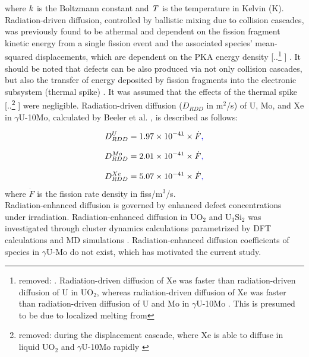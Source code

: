 \documentclass[preprint,12pt]{elsarticle}
\providecommand{\DIFadd}[1]{{\protect\color{blue} \sf #1}} %
\providecommand{\DIFdel}[1]{{\protect\color{red} [..\footnote{removed: #1} ]}} %
\providecommand{\DIFaddbegin}{} %
\providecommand{\DIFaddend}{} %
\providecommand{\DIFdelbegin}{} %
\providecommand{\DIFdelend}{} %
\newcommand{\DIFscaledelfig}{0.5}
\newlength{\DIFdelgraphicswidth} %
\newlength{\DIFdelgraphicsheight} %
\newcommand{\DIFaddincludegraphics}[2][]{{\color{blue}\fbox{\DIFOincludegraphics[#1]{#2}}}} %
\newcommand{\DIFdelincludegraphics}[2][]{%
\sbox{\DIFdelgraphicsbox}{\DIFOincludegraphics[#1]{#2}}%
\settoboxwidth{\DIFdelgraphicswidth}{\DIFdelgraphicsbox} %
\settoboxtotalheight{\DIFdelgraphicsheight}{\DIFdelgraphicsbox} %
\scalebox{\DIFscaledelfig}{%
\parbox[b]{\DIFdelgraphicswidth}{\usebox{\DIFdelgraphicsbox}\\[-\baselineskip] \rule{\DIFdelgraphicswidth}{0em}}\llap{\resizebox{\DIFdelgraphicswidth}{\DIFdelgraphicsheight}{%
\setlength{\unitlength}{\DIFdelgraphicswidth}%
\begin{picture}(1,1)%
\thicklines\linethickness{2pt} %
{\color[rgb]{1,0,0}\put(0,0){\framebox(1,1){}}}%
{\color[rgb]{1,0,0}\put(0,0){\line( 1,1){1}}}%
{\color[rgb]{1,0,0}\put(0,1){\line(1,-1){1}}}%
\end{picture}%
}\hspace*{3pt}}} %
} %
\DeclareRobustCommand{\DIFaddbegin}{\DIFOaddbegin \let\includegraphics\DIFaddincludegraphics} %
\DeclareRobustCommand{\DIFaddend}{\DIFOaddend \let\includegraphics\DIFOincludegraphics} %
\DeclareRobustCommand{\DIFdelbegin}{\DIFOdelbegin \let\includegraphics\DIFdelincludegraphics} %
\DeclareRobustCommand{\DIFdelend}{\DIFOaddend \let\includegraphics\DIFOincludegraphics} %
\begin{document}
\noindent where $\it{k}$ is the Boltzmann constant and $\it{T}$ is the temperature in Kelvin (K).\\
\indent Radiation-driven diffusion, controlled by ballistic mixing \DIFaddbegin \DIFadd{due to collision cascades}\DIFaddend , was previously found to be athermal and dependent on the fission fragment kinetic energy from a single fission event and the associated species' mean-squared displacements, which are dependent on the PKA energy density \DIFdelbegin \DIFdel{. Radiation-driven diffusion of Xe was faster than radiation-driven diffusion of U in UO$_{2}$, whereas radiation-driven diffusion of Xe was faster than radiation-driven diffusion of U and Mo in $\gamma$U-10Mo \cite{beeler2021radiation, cooper2016simulation}. This is presumed to be due to localized melting from }\DIFdelend \DIFaddbegin \DIFadd{\cite{beeler2021radiation}. It should be noted that defects can be also produced via not only collision cascades, but also the transfer of energy deposited by fission fragments into the electronic subsystem (thermal spike) \cite{kolotova2017atomistic, kolotova2019atomistic}. It was assumed that the effects of }\DIFaddend the thermal spike \DIFdelbegin \DIFdel{during the displacement cascade, where Xe is able to diffuse in liquid UO$_{2}$ and $\gamma$U-10Mo rapidly \cite{beeler2021radiation, cooper2016simulation}}\DIFdelend \DIFaddbegin \DIFadd{were negligible}\DIFaddend . Radiation-driven diffusion ($D_{RDD}$ \DIFaddbegin \DIFadd{in m$^{2}$/s}\DIFaddend ) of U, Mo, and Xe in $\gamma$U-10Mo, calculated by Beeler et al. \cite{beeler2021radiation}, is described as follows:

\begin{equation}
D_{RDD}^{U} = 1.97\times10^{-41}\times\dot{F}\DIFaddbegin \DIFadd{,
}\DIFaddend \end{equation}

\begin{equation}
D_{RDD}^{Mo} = 2.01\times10^{-41}\times\dot{F}\DIFaddbegin \DIFadd{,
}\DIFaddend \end{equation}

\begin{equation}
D_{RDD}^{Xe} = 5.07\times10^{-41}\times\dot{F}\DIFaddbegin \DIFadd{,
}\DIFaddend \end{equation}
where $\dot{F}$ is the fission rate density \DIFaddbegin \DIFadd{in  fiss/m$^{3}$/s}\DIFaddend .\\
\indent Radiation-enhanced diffusion is governed by enhanced defect concentrations under irradiation. Radiation-enhanced diffusion in UO$_{2}$ and U$_{3}$Si$_{2}$ was investigated through cluster dynamics calculations parametrized by DFT calculations and MD simulations \cite{perriot2019atomistic, andersson2014atomistic, matthews2020cluster}. Radiation-enhanced diffusion coefficients of species in $\gamma$U-Mo do not exist, which has motivated the current study.
\end{document}
